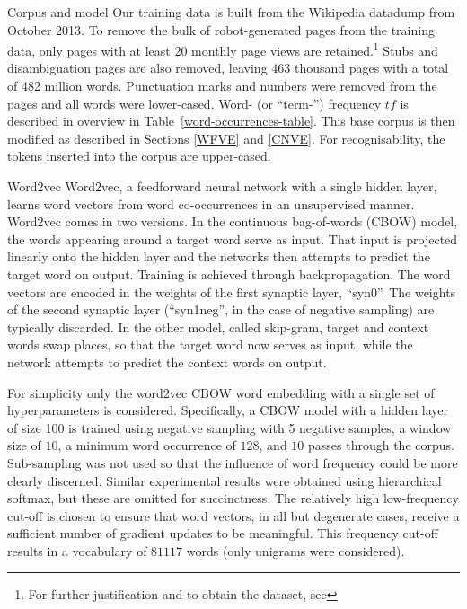 \documentclass{article} %
\begin{document}
\begin{section}{Corpus and model}\label{corpus-and-model}
Our training data is built from the Wikipedia datadump from October
2013.  To remove the bulk of robot-generated pages from the training
data, only pages with at least 20 monthly page views are
retained.\footnote{For further justification and to obtain the dataset,
  see \blogpost} Stubs and disambiguation pages are also removed,
leaving 463 thousand pages with a total of 482 million words.
Punctuation marks and numbers were removed from the pages and all words
were lower-cased.  Word- (or ``term-'') frequency $tf$ is described in overview
in Table~\ref{word-occurrences-table}.  This base corpus is then
modified as described in Sections \ref{WFVE} and \ref{CNVE}.  For
recognisability, the tokens inserted into the corpus are upper-cased.

\begin{subsection}{Word2vec}\label{word2vec}
Word2vec, a feedforward neural network with a single hidden
layer, learns word vectors from word co-occurrences in an unsupervised
manner.  Word2vec comes in two versions.  In the continuous bag-of-words
(CBOW) model, the words appearing around a target word serve as input.
That input is projected linearly onto the hidden layer and the networks
then attempts to predict the target word on output.  Training is
achieved through backpropagation.  The word vectors are encoded in the
weights of the first synaptic layer, ``syn0''.  The weights of the
second synaptic layer (``syn1neg'', in the case of negative sampling) are typically discarded.  In the other model,
called skip-gram, target and context words swap places, so that the
target word now serves as input, while the network attempts to predict
the context words on output.

For simplicity only the word2vec CBOW word embedding with a single set
of hyperparameters is considered.  Specifically, a CBOW model with a
hidden layer of size 100 is trained using negative sampling with 5
negative samples, a window size of $10$, a minimum word occurrence of
$128$, and $10$ passes through the corpus.  Sub-sampling was not used so
that the influence of word frequency could be more clearly discerned.
Similar experimental results were obtained using hierarchical softmax,
but these are omitted for succinctness.  The relatively high
low-frequency cut-off is chosen to ensure that word vectors, in all but
degenerate cases, receive a sufficient number of gradient updates to be
meaningful.  This frequency cut-off results in a vocabulary of $81117$
words (only unigrams were considered).


\end{subsection}
\end{section}
\end{document}
